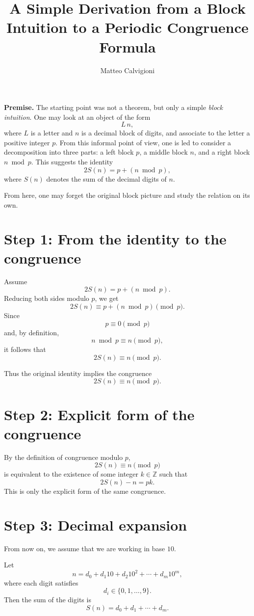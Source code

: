 \documentclass[12pt]{article}
\title{A Simple Derivation from a Block Intuition to a Periodic Congruence Formula}
\author{Matteo Calvigioni}
\date{}
\begin{document}
\maketitle

\noindent
\textbf{Premise.}
The starting point was not a theorem, but only a simple \emph{block intuition}. 
One may look at an object of the form
\[
L\,n,
\]
where \(L\) is a letter and \(n\) is a decimal block of digits, and associate to the letter a positive integer \(p\).
From this informal point of view, one is led to consider a decomposition into three parts:
a left block \(p\), a middle block \(n\), and a right block \(n \bmod p\).
This suggests the identity
\[
2S(n)=p+(n \bmod p),
\]
where \(S(n)\) denotes the sum of the decimal digits of \(n\).

\medskip

\noindent
From here, one may forget the original block picture and study the relation on its own.

\section*{Step 1: From the identity to the congruence}

Assume
\[
2S(n)=p+(n \bmod p).
\]
Reducing both sides modulo \(p\), we get
\[
2S(n)\equiv p+(n \bmod p)\pmod p.
\]
Since
\[
p\equiv 0 \pmod p
\]
and, by definition,
\[
n \bmod p \equiv n \pmod p,
\]
it follows that
\[
2S(n)\equiv n \pmod p.
\]

Thus the original identity implies the congruence
\[
2S(n)\equiv n \pmod p.
\]

\section*{Step 2: Explicit form of the congruence}

By the definition of congruence modulo \(p\),
\[
2S(n)\equiv n \pmod p
\]
is equivalent to the existence of some integer \(k\in\mathbb{Z}\) such that
\[
2S(n)-n=pk.
\]
This is only the explicit form of the same congruence.

\section*{Step 3: Decimal expansion}

From now on, we assume that we are working in base \(10\).

Let
\[
n=d_0+d_1 10+d_2 10^2+\cdots+d_m 10^m,
\]
where each digit satisfies
\[
d_i\in\{0,1,\dots,9\}.
\]
Then the sum of the digits is
\[
S(n)=d_0+d_1+\cdots+d_m.
\]
\end{document}
